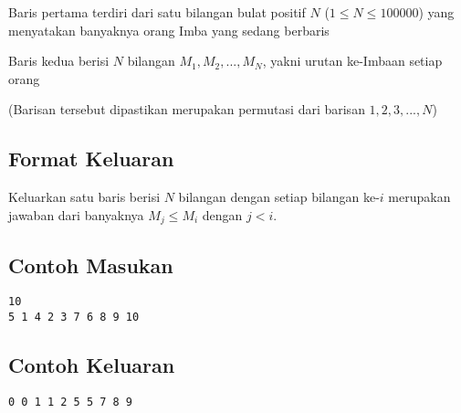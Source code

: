 \documentclass{article}
\begin{document}
Baris pertama terdiri dari satu bilangan bulat positif $N$ ($1 \leq N \leq 100000$) yang menyatakan banyaknya orang Imba yang sedang berbaris

Baris kedua berisi $N$ bilangan $M_1, M_2, ..., M_N$, yakni urutan ke-Imbaan setiap orang

(Barisan tersebut dipastikan merupakan permutasi dari barisan $1, 2, 3, ..., N$)

\subsection*{Format Keluaran}

Keluarkan satu baris berisi $N$ bilangan dengan setiap bilangan ke-$i$ merupakan jawaban dari banyaknya $M_j \leq M_i$ dengan $j < i$.

\begin{multicols}{2}
\subsection*{Contoh Masukan}
\begin{lstlisting}
10
5 1 4 2 3 7 6 8 9 10
\end{lstlisting}
\columnbreak
\subsection*{Contoh Keluaran}
\begin{lstlisting}
0 0 1 1 2 5 5 7 8 9
\end{lstlisting}
\vfill
\null
\end{multicols}


\pagebreak
\end{document}
